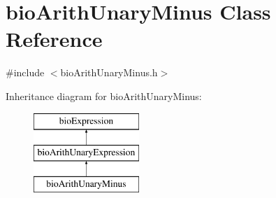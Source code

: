 \hypertarget{classbio_arith_unary_minus}{}\section{bio\+Arith\+Unary\+Minus Class Reference}
\label{classbio_arith_unary_minus}


{\ttfamily \#include $<$bio\+Arith\+Unary\+Minus.\+h$>$}

Inheritance diagram for bio\+Arith\+Unary\+Minus\+:\begin{figure}[H]
\begin{center}
\leavevmode
\includegraphics[height=3.000000cm]{classbio_arith_unary_minus}
\end{center}
\end{figure}

